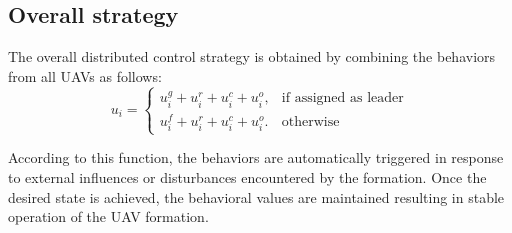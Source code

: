 \subsection{Overall strategy}
The overall distributed control strategy is obtained by combining the behaviors from all UAVs as follows:%
\begin{equation}
    u_{i}=\left\{ \begin{array}{cc}
u_{i}^{g}+u_{i}^{r}+u_{i}^{c}+u_{i}^{o}, & \text{if assigned as leader}\\
u_{i}^{f}+u_{i}^{r}+u_{i}^{c}+u_{i}^{o}. & \text{otherwise}
\end{array}\right.
\end{equation}

According to this function, the behaviors are automatically triggered in response to external influences or disturbances encountered by the formation. Once the desired state is achieved, the behavioral values are maintained resulting in stable operation of the UAV formation.
